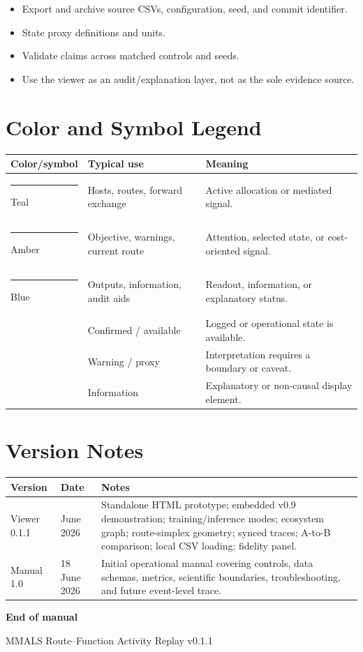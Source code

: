\documentclass[11pt,a4paper]{article}
\newcommand{\good}{\textcolor{MMALSGreen}{\faCheckCircle}}
\newcommand{\warn}{\textcolor{MMALSAmber}{\faExclamationTriangle}}
\newcommand{\infoicon}{\textcolor{MMALSBlue}{\faInfoCircle}}
\begin{document}
\begin{keybox}
\begin{itemize}
  \item Export and archive source CSVs, configuration, seed, and commit identifier.
  \item State proxy definitions and units.
  \item Validate claims across matched controls and seeds.
  \item Use the viewer as an audit/explanation layer, not as the sole evidence source.
\end{itemize}
\end{keybox}

\section{Color and Symbol Legend}

\begin{table}[h]
\centering
\begin{tabularx}{\textwidth}{@{}P{26mm}P{35mm}Y@{}}
\toprule
\textbf{Color/symbol} & \textbf{Typical use} & \textbf{Meaning}\\
\midrule
\textcolor{MMALSTeal}{\rule{12mm}{2mm}} Teal & Hosts, routes, forward exchange & Active allocation or mediated signal.\\
\textcolor{MMALSAmber}{\rule{12mm}{2mm}} Amber & Objective, warnings, current route & Attention, selected state, or cost-oriented signal.\\
\textcolor{MMALSBlue}{\rule{12mm}{2mm}} Blue & Outputs, information, audit aids & Readout, information, or explanatory status.\\
\good & Confirmed / available & Logged or operational state is available.\\
\warn & Warning / proxy & Interpretation requires a boundary or caveat.\\
\infoicon & Information & Explanatory or non-causal display element.\\
\bottomrule
\end{tabularx}
\end{table}

\section{Version Notes}

\begin{tabularx}{\textwidth}{@{}P{24mm}P{28mm}Y@{}}
\toprule
\textbf{Version} & \textbf{Date} & \textbf{Notes}\\
\midrule
Viewer 0.1.1 & June 2026 & Standalone HTML prototype; embedded v0.9 demonstration; training/inference modes; ecosystem graph; route-simplex geometry; synced traces; A-to-B comparison; local CSV loading; fidelity panel.\\
Manual 1.0 & 18 June 2026 & Initial operational manual covering controls, data schemas, metrics, scientific boundaries, troubleshooting, and future event-level trace.\\
\bottomrule
\end{tabularx}

\vfill
\begin{center}
{\sffamily\bfseries\color{MMALSTeal} End of manual}\par
\smallskip
{\small MMALS Route--Function Activity Replay v0.1.1}
\end{center}
\end{document}

